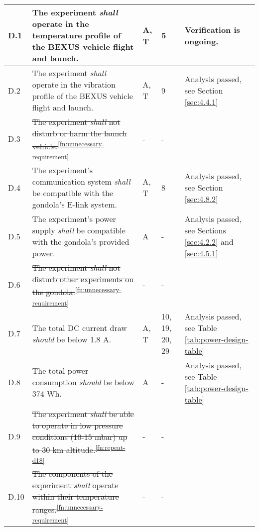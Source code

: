 \begin{longtable}[]{|m{}| m{} |m{} |m{}|m{}|}
D.1  & The experiment \textit{shall} operate in the temperature profile of the BEXUS vehicle flight and launch.                                                                         &       A, T       & 5            & Verification is ongoing.     \\ \hline
D.2  & The experiment \textit{shall} operate in the vibration profile of the BEXUS vehicle flight and launch.                                                                           &       A, T       & 9            &  Analysis passed, see Section \ref{sec:4.4.1}       \\ \hline
D.3  & \st{The experiment \textit{shall} not disturb or harm the launch vehicle.}\textsuperscript{\ref{fn:unnecessary-requirement}}                                                                                                             &      -      & -          &        \\ \hline
D.4  & The experiment's communication system \textit{shall} be compatible with the gondola's E-link system.                                                                             &      A, T        & 8            &    Analysis passed, see Section \ref{sec:4.8.2}    \\ \hline
D.5  & The experiment's power supply \textit{shall
} be compatible with the gondola's provided power.                                                                                    &      A       &  -           & Analysis passed, see Sections \ref{sec:4.2.2} and \ref{sec:4.5.1}      \\ \hline
D.6  & \st{The experiment \textit{shall} not disturb other experiments on the gondola.}\textsuperscript{\ref{fn:unnecessary-requirement}}                                                                                                       &      -      & -           &        \\ \hline
D.7  & The total DC current draw \textit{should} be below 1.8 A. &      A, T        & 10, 19, 20, 29            & Analysis passed, see Table \ref{tab:power-design-table}        \\ \hline
D.8  & The total power consumption \textit{should} be below 374 Wh.& A & - & Analysis passed, see Table \ref{tab:power-design-table} \\ \hline
D.9  & \st{The experiment \textit{shall} be able to operate in low pressure conditions (10-15 mbar) up to 30 km altitude.}\textsuperscript{\ref{fn:repeat-d18}} &- &  - &        \\ \hline
D.10 & \st{The components of the experiment \textit{shall} operate within their temperature ranges.}\textsuperscript{\ref{fn:unnecessary-requirement}}                                                                                          &       -     & -           &        \\  \hline

\end{longtable}
